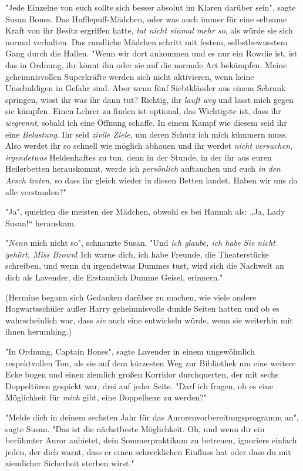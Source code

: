 {"Jede Einzelne von euch sollte sich besser absolut im Klaren darüber sein", sagte Susan Bones. Das Hufflepuff-Mädchen, oder was auch immer für eine seltsame Kraft von ihr Besitz ergriffen hatte, \emph{tat nicht einmal mehr so}, als würde sie sich normal verhalten. Das rundliche Mädchen schritt mit festem, selbstbewusstem Gang durch die Hallen. "Wenn wir dort ankommen und es nur ein Rowdie ist, ist das in Ordnung, ihr könnt ihn oder sie auf die normale Art bekämpfen. Meine geheimnisvollen Superkräfte werden sich nicht aktivieren, wenn keine Unschuldigen in Gefahr sind. Aber wenn fünf Siebtklässler aus einem Schrank springen, wisst ihr was ihr dann tut? Richtig, ihr \emph{lauft} \emph{weg} und lasst mich gegen sie kämpfen. Einen Lehrer zu finden ist optional, das Wichtigste ist, dass ihr \emph{wegrennt}, sobald ich eine Öffnung schaffe. In einem Kampf wie diesem seid ihr eine \emph{Belastung}. Ihr seid \emph{zivile Ziele}, um deren Schutz ich mich kümmern muss. Also werdet ihr so schnell wie möglich abhauen und ihr werdet \emph{nicht versuchen}, \emph{irgendetwas} Heldenhaftes zu tun, denn in der Stunde, in der ihr aus euren Heilerbetten herauskommt, werde ich \emph{persönlich} auftauchen und euch \emph{in} \emph{den Arsch treten,} so dass ihr gleich wieder in diesen Betten landet\emph{.} Haben wir uns da alle verstanden?"

"Ja", quiekten die meisten der Mädchen, obwohl es bei Hannah als: „Ja, Lady Susan!“ herauskam.

"\emph{Nenn} mich nicht so", schnauzte Susan. "Und \emph{ich glaube, ich habe Sie nicht} \emph{gehört, Miss Brown}! Ich warne dich, ich habe Freunde, die Theaterstücke schreiben, und wenn du irgendetwas Dummes tust, wird sich die Nachwelt an dich als Lavender, die Erstaunlich Dumme Geisel, erinnern."

(Hermine begann sich Gedanken darüber zu machen, wie viele andere Hogwartsschüler außer Harry geheimnisvolle dunkle Seiten hatten und ob es wahrscheinlich war, dass \emph{sie} auch eine entwickeln würde, wenn sie weiterhin mit ihnen herumhing.)

"In Ordnung, Captain Bones", sagte Lavender in einem ungewöhnlich respektvollen Ton, als sie auf dem kürzesten Weg zur Bibliothek um eine weitere Ecke bogen und einen ziemlich großen Korridor durchquerten, der mit sechs Doppeltüren gespickt war, drei auf jeder Seite. "Darf ich fragen, ob es eine Möglichkeit für \emph{mich} gibt, eine Doppelhexe zu werden?"

"Melde dich in deinem sechsten Jahr für das Aurorenvorbereitungsprogramm an", sagte Susan. "Das ist die nächstbeste Möglichkeit. Oh, und wenn dir ein berühmter Auror anbietet, dein Sommerpraktikum zu betreuen, ignoriere einfach jeden, der dich warnt, dass er einen schrecklichen Einfluss hat oder dass du mit ziemlicher Sicherheit sterben wirst."

}
